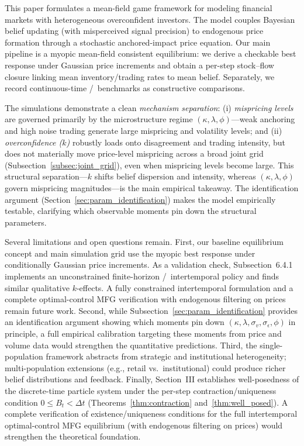 
This paper formulates a mean-field game framework for modeling financial markets with heterogeneous overconfident investors. The model couples Bayesian belief updating (with misperceived signal precision) to endogenous price formation through a stochastic anchored-impact price equation. Our main pipeline is a myopic mean-field consistent equilibrium: we derive a checkable \CARA best response under Gaussian price increments and obtain a per-step stock--flow closure linking mean inventory/trading rates to mean belief. Separately, we record continuous-time \CARA/\LQG\ benchmarks as constructive comparisons.

The simulations demonstrate a clean \emph{mechanism separation}: (i) \emph{mispricing levels} are governed primarily by the microstructure regime $(\kappa,\lambda,\phi)$---weak anchoring and high noise trading generate large mispricing and volatility levels; and (ii) \emph{overconfidence ($k$)} robustly loads onto disagreement and trading intensity, but does not materially move price-level mispricing across a broad joint grid (Subsection~\ref{subsec:joint_grid}), even when mispricing levels become large. This structural separation---$k$ shifts belief dispersion and intensity, whereas $(\kappa,\lambda,\phi)$ govern mispricing magnitudes---is the main empirical takeaway. The identification argument (Section~\ref{sec:param_identification}) makes the model empirically testable, clarifying which observable moments pin down the structural parameters.

Several limitations and open questions remain. First, our baseline equilibrium concept and main simulation grid use the myopic \CARA best response under conditionally Gaussian price increments. As a validation check, Subsection~6.4.1 implements an unconstrained finite-horizon \CARA/\LQG\ intertemporal policy and finds similar qualitative $k$-effects. A fully constrained intertemporal formulation and a complete optimal-control MFG verification with endogenous filtering on prices remain future work. Second, while Subsection~\ref{sec:param_identification} provides an identification argument showing which moments pin down $(\kappa,\lambda,\sigma_v,\sigma_\epsilon,\phi)$ in principle, a full empirical calibration targeting these moments from price and volume data would strengthen the quantitative predictions. Third, the single-population framework abstracts from strategic and institutional heterogeneity; multi-population extensions (e.g., retail vs.\ institutional) could produce richer belief distributions and feedback. Finally, Section~III establishes well-posedness of the discrete-time particle system under the per-step contraction/uniqueness condition $0\le B_t<\Delta t$ (Theorems~\ref{thm:contraction} and~\ref{thm:well_posed}). A complete verification of existence/uniqueness conditions for the full intertemporal optimal-control MFG equilibrium (with endogenous filtering on prices) would strengthen the theoretical foundation.
